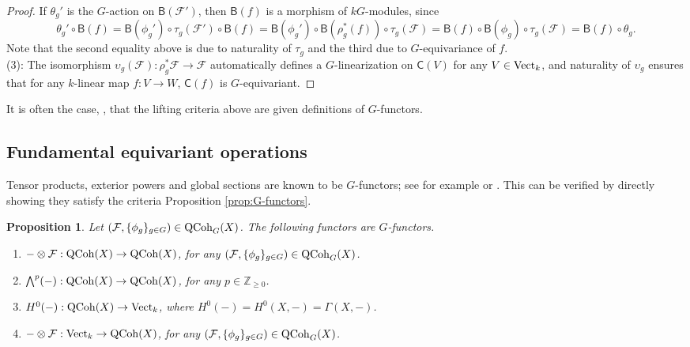 \documentclass[10pt]{amsart}
\newtheorem{proposition}[theorem]{Proposition}
\theoremstyle{definition}
\begin{document}
\begin{proof}
If $\theta_g'$ is the $G$-action on $\mathsf{B}(\mathcal{F}')$, then $\mathsf{B}(f)$ is a morphism of $kG$-modules, since
\[
\theta_g'\circ \mathsf{B}(f)
=\mathsf{B}(\phi_g')\circ\tau_g(\mathcal{F'})\circ \mathsf{B}(f)
=\mathsf{B}(\phi_g')\circ \mathsf{B}(\rho_g^*(f))\circ\tau_g(\mathcal{F})
=\mathsf{B}(f)\circ \mathsf{B}(\phi_g)\circ\tau_g(\mathcal{F})
=\mathsf{B}(f)\circ \theta_g.
\]
Note that the second equality above is due to naturality of $\tau_g$ and the third due to $G$-equivariance of $f$.\\

(3): The isomorphism $\upsilon_g(\mathcal{F}):\rho_g^*\mathcal{F}\rightarrow\mathcal{F}$ automatically defines a $G$-linearization on $\mathsf{C}(V)$ for any $V\in{\rm Vect}_k$, and naturality of $\upsilon_g$ ensures that for any $k$-linear map $f:V\rightarrow W$, $\mathsf{C}(f)$ is $G$-equivariant.
\end{proof}

 It is often the case, {\cite[2.8]{MR3979084}}, that the lifting criteria above are given definitions of $G$-functors.

\subsection{Fundamental equivariant operations}
Tensor products, exterior powers and global sections are known to be $G$-functors; see for example {\cite[p.32]{MR1304906}} or \cite[p.94]{MR2665168}. This can be verified by directly showing they satisfy the criteria Proposition \ref{prop:G-functors}.
\begin{proposition}\label{prop:exGfunctors}
Let $(\mathcal{F},\{\phi_g\}_{g\in G})\in {\rm QCoh}_G(X)$. The following functors are $G$-functors.
\begin{enumerate}
\item
$ -\otimes \mathcal{F}:{\rm QCoh}(X)\rightarrow{\rm QCoh}(X)$, for any $ (\mathcal{F},\{\phi_g\}_{g\in G})\in {\rm QCoh}_G(X)$.\\
\item
$\bigwedge^p(-):{\rm QCoh}(X)\rightarrow {\rm QCoh}(X)$, for any $p\in\mathbb{Z}_{\geq 0}$.\\
\item 
$H^0(-):{\rm QCoh}(X)\rightarrow{\rm Vect}_k$, where $H^0(-)=H^0(X,-)=\Gamma(X,-)$.\\
\item 
$-\otimes\mathcal{F}:{\rm Vect}_k\rightarrow{\rm QCoh}(X)$, for any $ (\mathcal{F},\{\phi_g\}_{g\in G})\in {\rm QCoh}_G(X)$.
\end{enumerate}
\end{proposition}
\end{document}
